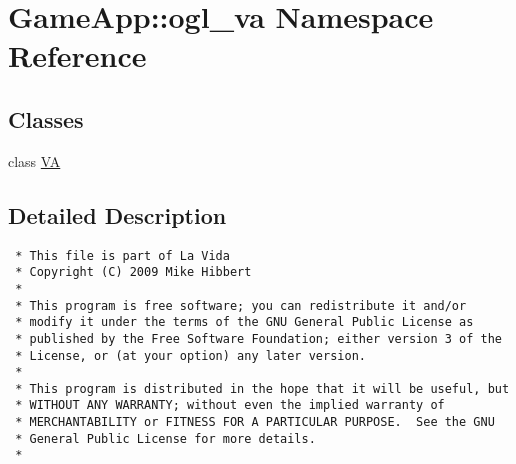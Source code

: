 \hypertarget{namespaceGameApp_1_1ogl__va}{
\section{GameApp::ogl\_\-va Namespace Reference}
\label{namespaceGameApp_1_1ogl__va}
}


\subsection*{Classes}
\begin{CompactItemize}
\item 
class \hyperlink{classGameApp_1_1ogl__va_1_1VA}{VA}
\end{CompactItemize}


\subsection{Detailed Description}


\footnotesize\begin{verbatim}
 * This file is part of La Vida
 * Copyright (C) 2009 Mike Hibbert
 *
 * This program is free software; you can redistribute it and/or
 * modify it under the terms of the GNU General Public License as
 * published by the Free Software Foundation; either version 3 of the
 * License, or (at your option) any later version.
 *
 * This program is distributed in the hope that it will be useful, but
 * WITHOUT ANY WARRANTY; without even the implied warranty of
 * MERCHANTABILITY or FITNESS FOR A PARTICULAR PURPOSE.  See the GNU
 * General Public License for more details.
 *
\end{verbatim}
\normalsize
 